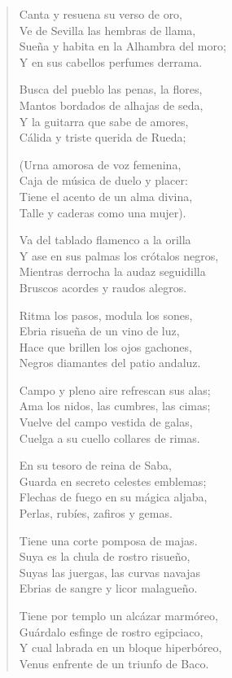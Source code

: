 \documentclass[12pt]{article}
\begin{document}
\begin{verse}
Canta y resuena su verso de oro,\\
Ve de Sevilla las hembras de llama,\\
Sueña y habita en la Alhambra del moro;\\
Y en sus cabellos perfumes derrama.  

Busca del pueblo las penas, la flores,\\
Mantos bordados de alhajas de seda,\\
Y la guitarra que sabe de amores,\\
Cálida y triste querida de Rueda;  

(Urna amorosa de voz femenina,\\
Caja de música de duelo y placer:\\
Tiene el acento de un alma divina,\\
Talle y caderas como una mujer).  

Va del tablado flamenco a la orilla\\
Y ase en sus palmas los crótalos negros,\\
Mientras derrocha la audaz seguidilla\\
Bruscos acordes y raudos alegros.  

Ritma los pasos, modula los sones,\\
Ebria risueña de un vino de luz,\\
Hace que brillen los ojos gachones,\\
Negros diamantes del patio andaluz.  

Campo y pleno aire refrescan sus alas;\\
Ama los nidos, las cumbres, las cimas;\\
Vuelve del campo vestida de galas,\\
Cuelga a su cuello collares de rimas.  

En su tesoro de reina de Saba,\\
Guarda en secreto celestes emblemas;\\
Flechas de fuego en su mágica aljaba,\\
Perlas, rubíes, zafiros y gemas.  

Tiene una corte pomposa de majas.\\
Suya es la chula de rostro risueño,\\
Suyas las juergas, las curvas navajas\\
Ebrias de sangre y licor malagueño.  

Tiene por templo un alcázar marmóreo,\\
Guárdalo esfinge de rostro egipciaco,\\
Y cual labrada en un bloque hiperbóreo,\\
Venus enfrente de un triunfo de Baco.  


\end{verse}
\end{document}
